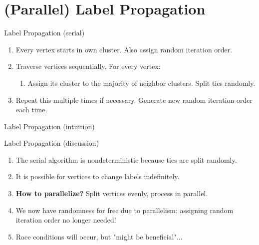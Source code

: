 \section{(Parallel) Label Propagation}

\begin{frame}{Label Propagation (serial)}{}
\begin{enumerate}
 \item<1-> Every vertex starts in own cluster. Also assign random iteration order.
 \item<2-> Traverse vertices sequentially. For every vertex:
 \begin{enumerate}
   \item<3-> Assign its cluster to the majority of neighbor clusters. Split ties randomly.
 \end{enumerate}
 \item<5-> Repeat this multiple times if necessary. Generate new random iteration order each time.
\end{enumerate}
\end{frame}

\begin{frame}{Label Propagation (intuition)}
\begin{figure}
  \caption{
    }
\end{figure}
\end{frame}

\begin{frame}{Label Propagation (discussion)}
\begin{enumerate}
    \item<1-> The serial algorithm is nondeterministic because ties are split randomly.
    \item<2-> It is possible for vertices to change labels indefinitely. 
    \item<3-> \textbf{How to parallelize?} Split vertices evenly, process in parallel.
    \item<4-> We now have randomness for free due to parallelism: assigning random iteration order no longer needed!
    \item<5-> Race conditions will occur, but "might be beneficial"...
\end{enumerate}
\end{frame}

